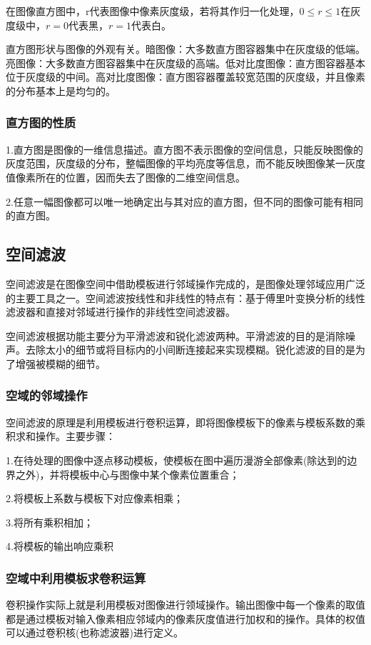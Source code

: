 \documentclass[11pt]{article}
\begin{document}
在图像直方图中，r代表图像中像素灰度级，若将其作归一化处理，$0\leq r\leq 1$在灰度级中，$r=0$代表黑，$r=1$代表白。

直方图形状与图像的外观有关。暗图像：大多数直方图容器集中在灰度级的低端。亮图像：大多数直方图容器集中在灰度级的高端。低对比度图像：直方图容器基本位于灰度级的中间。高对比度图像：直方图容器覆盖较宽范围的灰度级，并且像素的分布基本上是均匀的。
\subsubsection{直方图的性质}
1.直方图是图像的一维信息描述。直方图不表示图像的空间信息，只能反映图像的灰度范围，灰度级的分布，整幅图像的平均亮度等信息，而不能反映图像某一灰度值像素所在的位置，因而失去了图像的二维空间信息。

2.任意一幅图像都可以唯一地确定出与其对应的直方图，但不同的图像可能有相同的直方图。

\subsection{空间滤波}
空间滤波是在图像空间中借助模板进行邻域操作完成的，是图像处理邻域应用广泛的主要工具之一。空间滤波按线性和非线性的特点有：基于傅里叶变换分析的线性滤波器和直接对邻域进行操作的非线性空间滤波器。

空间滤波根据功能主要分为平滑滤波和锐化滤波两种。平滑滤波的目的是消除噪声。去除太小的细节或将目标内的小间断连接起来实现模糊。锐化滤波的目的是为了增强被模糊的细节。

\subsubsection{空域的邻域操作}
空间滤波的原理是利用模板进行卷积运算，即将图像模板下的像素与模板系数的乘积求和操作。主要步骤：

\noindent 1.在待处理的图像中逐点移动模板，使模板在图中遍历漫游全部像素(除达到的边界之外)，并将模板中心与图像中某个像素位置重合；

\noindent 2.将模板上系数与模板下对应像素相乘；

\noindent 3.将所有乘积相加；

\noindent 4.将模板的输出响应乘积

\subsubsection{空域中利用模板求卷积运算}
卷积操作实际上就是利用模板对图像进行领域操作。输出图像中每一个像素的取值都是通过模板对输入像素相应邻域内的像素灰度值进行加权和的操作。具体的权值可以通过卷积核(也称滤波器)进行定义。
\end{document}
